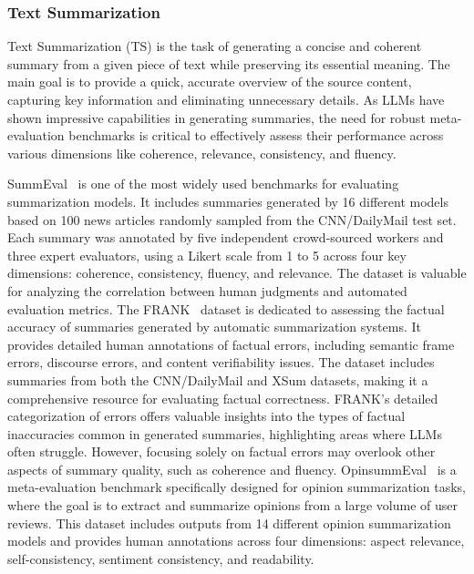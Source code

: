 \subsubsection{Text Summarization}
\label{sec:Text Summarization}
Text Summarization (TS) is the task of generating a concise and coherent summary from a given piece of text while preserving its essential meaning. The main goal is to provide a quick, accurate overview of the source content, capturing key information and eliminating unnecessary details. As LLMs have shown impressive capabilities in generating summaries, the need for robust meta-evaluation benchmarks is critical to effectively assess their performance across various dimensions like coherence, relevance, consistency, and fluency.

SummEval~\cite{fabbri2021summeval} is one of the most widely used benchmarks for evaluating summarization models. It includes summaries generated by 16 different models based on 100 news articles randomly sampled from the CNN/DailyMail test set. Each summary was annotated by five independent crowd-sourced workers and three expert evaluators, using a Likert scale from 1 to 5 across four key dimensions: coherence, consistency, fluency, and relevance. The dataset is valuable for analyzing the correlation between human judgments and automated evaluation metrics.
The FRANK~\cite{pagnoni2021understanding} dataset is dedicated to assessing the factual accuracy of summaries generated by automatic summarization systems. It provides detailed human annotations of factual errors, including semantic frame errors, discourse errors, and content verifiability issues. The dataset includes summaries from both the CNN/DailyMail and XSum datasets, making it a comprehensive resource for evaluating factual correctness. FRANK’s detailed categorization of errors offers valuable insights into the types of factual inaccuracies common in generated summaries, highlighting areas where LLMs often struggle. However, focusing solely on factual errors may overlook other aspects of summary quality, such as coherence and fluency.
OpinsummEval~\cite{shen2023opinsummeval} is a meta-evaluation benchmark specifically designed for opinion summarization tasks, where the goal is to extract and summarize opinions from a large volume of user reviews. This dataset includes outputs from 14 different opinion summarization models and provides human annotations across four dimensions: aspect relevance, self-consistency, sentiment consistency, and readability. 






